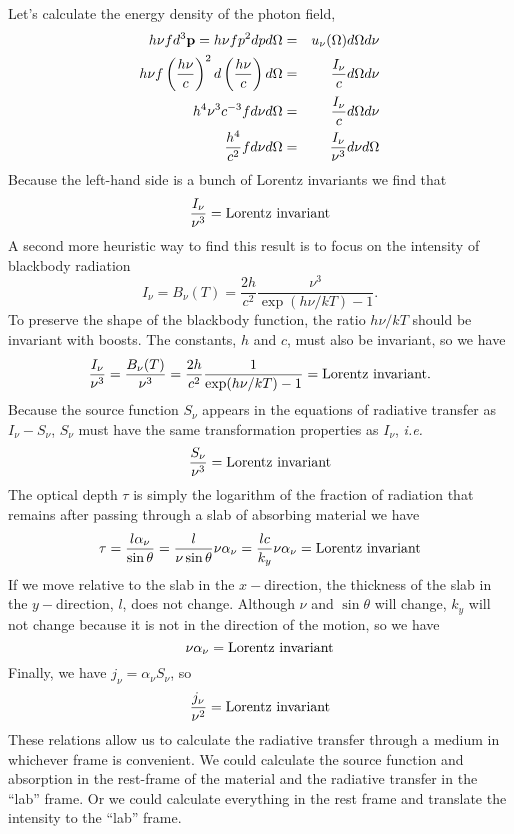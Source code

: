 Let's calculate the energy density of the photon field,
\begin{eqnarray}
h\nu f d^3 {\bf p} = h \nu f p^2 dp d\Omega &=& u_\nu (\Omega) d\Omega
d\nu \\
h\nu f \left (\frac{h\nu}{c} \right )^2 d \left (\frac{h\nu}{c}\right
) d\Omega &=& \frac{I_\nu}{c} d \Omega d\nu \\
h^4 \nu^3 c^{-3} f d\nu d\Omega &=& \frac{I_\nu}{c} d \Omega d\nu \\
\frac{h^4}{c^2} f d\nu d\Omega &=& \frac{I_\nu}{\nu^3} d\nu d\Omega
\label{eq:320}
\end{eqnarray}
Because the left-hand side is a bunch of Lorentz invariants we find
that
\begin{equation}
\frac{I_\nu}{\nu^3} = \hbox{\rm Lorentz invariant}
\label{eq:321}
\end{equation}
A second more heuristic way to find this result is to focus on the
intensity of  blackbody radiation
\begin{equation}
I_\nu = B_\nu(T) = \frac{2 h}{c^2} \frac{\nu^3}{\exp ( h \nu / k T) - 1}.
\end{equation}
To preserve the shape of the blackbody function, the ratio $h \nu/k T$
should be invariant with boosts.  The constants, $h$ and $c$, must
also be invariant, so we have
\begin{equation}
\frac{I_\nu}{\nu^3} = \frac{B_\nu(T)}{\nu^3} = \frac{2 h}{c^2}
\frac{1}{\exp ( h \nu / k T) - 1} = \hbox{\rm Lorentz invariant}.
\end{equation}
Because the source function $S_\nu$ appears in the equations of
radiative transfer as $I_\nu - S_\nu$, $S_\nu$ must have the same
transformation properties as $I_\nu$, {\em i.e.}
\begin{equation}
\frac{S_\nu}{\nu^3} = \hbox{\rm Lorentz invariant}
\label{eq:322}
\end{equation}
The optical depth $\tau$ is simply the logarithm of the fraction of
radiation that remains after passing through a slab of absorbing
material we have
\begin{equation}
\tau = \frac{l \alpha_\nu}{\sin \theta} = \frac{l}{\nu \sin \theta}
\nu \alpha_\nu = \frac{l c}{k_y} \nu \alpha_\nu = \hbox{\rm Lorentz invariant}
\label{eq:323}
\end{equation}
If we move relative to the slab in the $x-$direction, the thickness of
the slab in the $y-$direction, $l$, does not change.  Although $\nu$
and $\sin \theta$ will change, $k_y$ will not change because it is not
in the direction of the motion, so we have
\begin{equation}
\nu \alpha_\nu = \hbox{\rm Lorentz invariant}
\label{eq:324}
\end{equation}
Finally, we have $j_\nu = \alpha_\nu S_\nu$, so
\begin{equation}
\frac{j_\nu}{\nu^2} = \hbox{\rm Lorentz invariant}
\label{eq:325}
\end{equation}
These relations allow us to calculate the radiative transfer 
through a medium in whichever frame is convenient.  We could calculate
the source function and absorption in the rest-frame of the material 
and the radiative transfer in the ``lab'' frame.  Or we could
calculate everything in the rest frame and translate the intensity
to the ``lab'' frame.

